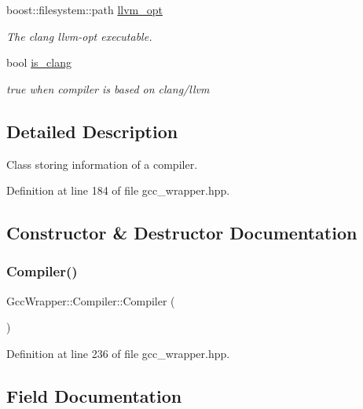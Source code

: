 \begin{DoxyCompactItemize}
boost\+::filesystem\+::path \hyperlink{classGccWrapper_1_1Compiler_a9205e2ca841c6216d3e2e6f426fc6055}{llvm\+\_\+opt}
\begin{DoxyCompactList}\small\item\em The clang llvm-\/opt executable. \end{DoxyCompactList}\item 
bool \hyperlink{classGccWrapper_1_1Compiler_a99436586f746a8e3cc9e6ca06a7c24c4}{is\+\_\+clang}
\begin{DoxyCompactList}\small\item\em true when compiler is based on clang/llvm \end{DoxyCompactList}\end{DoxyCompactItemize}


\subsection{Detailed Description}
Class storing information of a compiler. 

Definition at line 184 of file gcc\+\_\+wrapper.\+hpp.



\subsection{Constructor \& Destructor Documentation}
\mbox{\label{classGccWrapper_1_1Compiler_a3fc3a8f20dac666133fd11f8480d07dc}} 
\subsubsection{\texorpdfstring{Compiler()}{Compiler()}}
{\footnotesize\ttfamily Gcc\+Wrapper\+::\+Compiler\+::\+Compiler (\begin{DoxyParamCaption}{ }\end{DoxyParamCaption})\hspace{0.3cm}{\ttfamily [inline]}}



Definition at line 236 of file gcc\+\_\+wrapper.\+hpp.



\subsection{Field Documentation}
\mbox{\label{classGccWrapper_1_1Compiler_a213abeeea7562c9489c2e0ffdd7d468b}} 
